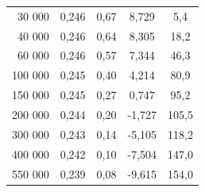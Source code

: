 \documentclass[a4paper, czech]{article}
\begin{document}
\begin{table}[H]
\begin{tabular}{rcccc}
        30 000      & 0,246                                                                       & 0,67                           & 8,729                                                        & 5,4                                                         \\
        40 000      & 0,246                                                                       & 0,64                           & 8,305                                                        & 18,2                                                        \\
        60 000      & 0,246                                                                       & 0,57                           & 7,344                                                        & 46,3                                                        \\
        100 000     & 0,245                                                                       & 0,40                           & 4,214                                                        & 80,9                                                        \\
        150 000     & 0,245                                                                       & 0,27                           & 0,747                                                        & 95,2                                                        \\
        200 000     & 0,244                                                                       & 0,20                           & -1,727                                                       & 105,5                                                       \\
        300 000     & 0,243                                                                       & 0,14                           & -5,105                                                       & 118,2                                                       \\
        400 000     & 0,242                                                                       & 0,10                           & -7,504                                                       & 147,0                                                       \\
        550 000     & 0,239                                                                       & 0,08                           & -9,615                                                       & 154,0                                                       \\

\end{tabular}
\end{table}
\end{document}
